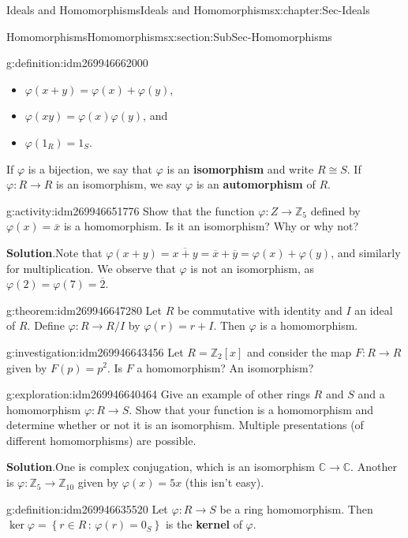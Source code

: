 \documentclass[oneside,10pt,]{book}
\newcommand{\terminology}[1]{\textbf{#1}}
\numberwithin{equation}{section}
\def\p{\varphi}
\newcommand{\setof}[2]{{\left\{#1\,\colon\,#2\right\}}}
\def\C{{\mathbb C}}
\def\Z{{\mathbb Z}}
\begin{document}
\begin{chapterptx}{Ideals and Homomorphisms}{}{Ideals and Homomorphisms}{}{}{x:chapter:Sec-Ideals}
\begin{sectionptx}{Homomorphisms}{}{Homomorphisms}{}{}{x:section:SubSec-Homomorphisms}
\begin{definition}{}{g:definition:idm269946662000}
\begin{itemize}[label=\textbullet]
\item{}\(\p(x+y) = \p(x) + \p(y)\),%
\item{}\(\p(xy) = \p(x)\p(y)\), and%
\item{}\(\p(1_R) = 1_S\).%
\end{itemize}
If \(\p\) is a bijection, we say that \(\p\) is an \terminology{isomorphism} and write \(R\cong S\). If \(\p : R\to R\) is an isomorphism, we say \(\p\) is an \terminology{automorphism} of \(R\).%
\end{definition}
\begin{activity}{}{g:activity:idm269946651776}%
Show that the function \(\p : Z\to \Z_{5}\) defined by \(\p(x) = \overline{x}\) is a homomorphism. Is it an isomorphism? Why or why not?%
\par\smallskip%
\noindent\textbf{Solution}.\hypertarget{g:solution:idm269946649696}{}\quad{}Note that \(\p(x+y) = \overline{x+y} = \overline{x} + \overline{y} = \p(x) + \p(y)\), and similarly for multiplication. We observe that \(\p\) is not an isomorphism, as \(\p(2) = \p(7) = \overline{2}\).%
\end{activity}
\begin{theorem}{}{}{g:theorem:idm269946647280}%
Let \(R\) be commutative with identity and \(I\) an ideal of \(R\). Define \(\p: R\to R/I\) by \(\p(r) = r+I\). Then \(\p\) is a homomorphism.%
\end{theorem}
\begin{investigation}{}{g:investigation:idm269946643456}%
Let \(R = \Z_2[x]\) and consider the map \(F: R \to R\) given by \(F(p) = p^2\). Is \(F\) a homomorphism? An isomorphism?%
\end{investigation}
\begin{exploration}{}{g:exploration:idm269946640464}%
Give an example of other rings \(R\) and \(S\) and a homomorphism \(\p : R\to S\). Show that your function is a homomorphism and determine whether or not it is an isomorphism. Multiple presentations (of different homomorphisms) are possible.%
\par\smallskip%
\noindent\textbf{Solution}.\hypertarget{g:solution:idm269946637856}{}\quad{}One is complex conjugation, which is an isomorphism \(\C\to\C\). Another is \(\p : \Z_5 \to \Z_{10}\) given by \(\p(x) = 5x\) (this isn't easy).%
\end{exploration}
\begin{definition}{}{g:definition:idm269946635520}%
Let \(\p : R \to S\) be a ring homomorphism. Then \(\ker \p =\setof{r\in R}{\p(r)=0_S}\) is the \terminology{kernel} of \(\p\).%

\end{definition}
\end{sectionptx}
\end{chapterptx}
\end{document}
